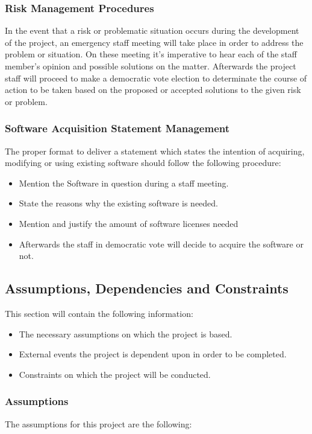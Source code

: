\documentclass[12pt]{article}
\begin{document}
\subsubsection{Risk Management Procedures}
In the event that a risk or problematic situation occurs during the development of the project, an emergency staff meeting will take place in order to address the problem or situation. On these meeting it’s imperative to hear each of the staff member’s opinion and possible solutions on the matter. Afterwards the project staff will proceed to make a democratic vote election to determinate the course of action to be taken based on the proposed or accepted solutions to the given risk or problem.

\subsubsection{Software Acquisition Statement Management}
The proper format to deliver a statement which states the intention of acquiring, modifying or using existing software should follow the following procedure:

\begin{itemize}
  \item	Mention the Software in question during a staff meeting.
  \item State the reasons why the existing software is needed.
  \item Mention and justify the amount of software licenses needed
  \item Afterwards the staff in democratic vote will decide to acquire the software or not.
\end{itemize}

\subsection{Assumptions, Dependencies and Constraints}
This section will contain the following information:

 \begin{itemize}
   \item The necessary assumptions on which the project is based.
   \item External events the project is dependent upon in order to be completed.
   \item Constraints on which the project will be conducted.
 \end{itemize}

\subsubsection{Assumptions}
The assumptions for this project are the following:
\end{document}
